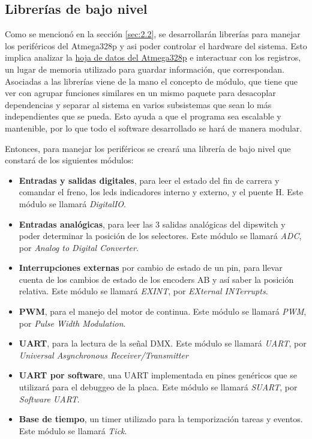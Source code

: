 \subsection{Librerías de bajo nivel}
Como se mencionó en la sección \ref{sec:2.2}, se desarrollarán librerías para manejar los periféricos del Atmega328p y asi poder controlar el hardware del sistema. Esto implica analizar la \href{http://www.atmel.com/Images/Atmel-42735-8-bit-AVR-Microcontroller-ATmega328-328P_Datasheet.pdf}{hoja de datos del Atmega328p} e interactuar con los registros, un lugar de memoria utilizado para guardar información, que correspondan.\\ 
Asociadas a las librerías viene de la mano el concepto de módulo, que tiene que ver con agrupar funciones similares en un mismo paquete para desacoplar dependencias y separar al sistema en varios subsistemas que sean lo más independientes que se pueda. Esto ayuda a que el programa sea escalable y mantenible, por lo que todo el software desarrollado se hará de manera modular.

Entonces, para manejar los periféricos se creará una librería de bajo nivel que constará de los siguientes módulos:
\begin{itemize}
	\item \textbf{Entradas y salidas digitales}, para leer el estado del fin de carrera y comandar el freno, los leds indicadores interno y externo, y el puente H. Este módulo se llamará \textit{DigitalIO}.
	\item \textbf{Entradas analógicas}, para leer las 3 salidas analógicas del dipswitch y poder determinar la posición de los selectores. Este módulo se llamará \textit{ADC}, por \textit{Analog to Digital Converter}.
	\item \textbf{Interrupciones externas} por cambio de estado de un pin, para llevar cuenta de los cambios de estado de los encoders AB y así saber la posición relativa. Este módulo se llamará \textit{EXINT}, por \textit{EXternal INTerrupts}.
	\item \textbf{PWM}, para el manejo del motor de continua. Este módulo se llamará \textit{PWM}, por \textit{Pulse Width Modulation}.
	\item \textbf{UART}, para la lectura de la señal DMX. Este módulo se llamará \textit{UART}, por \textit{Universal Asynchronous Receiver/Transmitter}
	\item \textbf{UART por software}, una UART implementada en pines genéricos que se utilizará para el debuggeo de la placa. Este módulo se llamará \textit{SUART}, por \textit{Software UART}.
	\item \textbf{Base de tiempo}, un timer utilizado para la temporización tareas y eventos. Este módulo se llamará \textit{Tick}.
\end{itemize}

